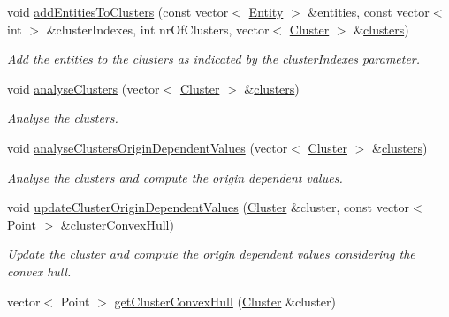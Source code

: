 \begin{DoxyCompactItemize}
void \hyperlink{classmultiscale_1_1analysis_1_1ClusterDetector_aefc4d0736d8af4ab53f1e5e76440f447}{add\-Entities\-To\-Clusters} (const vector$<$ \hyperlink{classmultiscale_1_1analysis_1_1Entity}{Entity} $>$ \&entities, const vector$<$ int $>$ \&cluster\-Indexes, int nr\-Of\-Clusters, vector$<$ \hyperlink{classmultiscale_1_1analysis_1_1Cluster}{Cluster} $>$ \&\hyperlink{classmultiscale_1_1analysis_1_1ClusterDetector_aa81a8649bc743389c2fc1919d47eb5b3}{clusters})
\begin{DoxyCompactList}\small\item\em Add the entities to the clusters as indicated by the cluster\-Indexes parameter. \end{DoxyCompactList}\item 
void \hyperlink{classmultiscale_1_1analysis_1_1ClusterDetector_af994e960ba3cd76cc67e714ea276264a}{analyse\-Clusters} (vector$<$ \hyperlink{classmultiscale_1_1analysis_1_1Cluster}{Cluster} $>$ \&\hyperlink{classmultiscale_1_1analysis_1_1ClusterDetector_aa81a8649bc743389c2fc1919d47eb5b3}{clusters})
\begin{DoxyCompactList}\small\item\em Analyse the clusters. \end{DoxyCompactList}\item 
void \hyperlink{classmultiscale_1_1analysis_1_1ClusterDetector_affff27bd4559d1272913ff1bceb229b5}{analyse\-Clusters\-Origin\-Dependent\-Values} (vector$<$ \hyperlink{classmultiscale_1_1analysis_1_1Cluster}{Cluster} $>$ \&\hyperlink{classmultiscale_1_1analysis_1_1ClusterDetector_aa81a8649bc743389c2fc1919d47eb5b3}{clusters})
\begin{DoxyCompactList}\small\item\em Analyse the clusters and compute the origin dependent values. \end{DoxyCompactList}\item 
void \hyperlink{classmultiscale_1_1analysis_1_1ClusterDetector_ac7e008a7674205095f94b91c8d7cdccc}{update\-Cluster\-Origin\-Dependent\-Values} (\hyperlink{classmultiscale_1_1analysis_1_1Cluster}{Cluster} \&cluster, const vector$<$ Point $>$ \&cluster\-Convex\-Hull)
\begin{DoxyCompactList}\small\item\em Update the cluster and compute the origin dependent values considering the convex hull. \end{DoxyCompactList}\item 
vector$<$ Point $>$ \hyperlink{classmultiscale_1_1analysis_1_1ClusterDetector_a4a071efa7d7812c1db9ee577b7893902}{get\-Cluster\-Convex\-Hull} (\hyperlink{classmultiscale_1_1analysis_1_1Cluster}{Cluster} \&cluster)

\end{DoxyCompactItemize}
